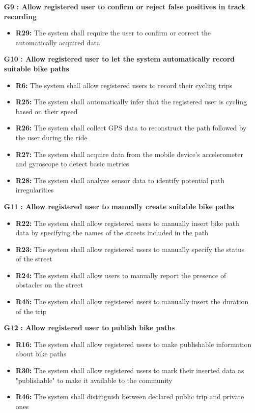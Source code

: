 \textbf{G9 : Allow registered user to confirm or reject false positives in track recording}
\begin{itemize}
    \item \textbf{R29:} The system shall require the user to confirm or correct the automatically acquired data
\end{itemize}
\vspace{1cm}

\textbf{G10 : Allow registered user to let the system automatically record suitable bike paths}
\begin{itemize}
    \item \textbf{R6:} The system shall allow registered users to record their cycling trips
    \item \textbf{R25:} The system shall automatically infer that the registered user is cycling based on their speed
    \item \textbf{R26:} The system shall collect GPS data to reconstruct the path followed by the user during the ride
    \item \textbf{R27:} The system shall acquire data from the mobile device's accelerometer and gyroscope to detect basic metrics
    \item \textbf{R28:} The system shall analyze sensor data to identify potential path irregularities
\end{itemize}
\vspace{1cm}

\textbf{G11 : Allow registered user to manually create suitable bike paths}
\begin{itemize}
    \item \textbf{R22:} The system shall allow registered users to manually insert bike path data by specifying the names of the streets included in the path
    \item \textbf{R23:} The system shall allow registered users to manually specify the status of the street
    \item \textbf{R24:} The system shall allow users to manually report the presence of obstacles on the street
    \item \textbf{R45:} The system shall allow registered users to manually insert the duration of the trip
\end{itemize}
\vspace{1cm}

\textbf{G12 : Allow registered user to publish bike paths}
\begin{itemize}
    \item \textbf{R16:} The system shall allow registered users to make publishable information about bike paths
    \item \textbf{R30:} The system shall allow registered users to mark their inserted data as "publishable" to make it available to the community
    \item \textbf{R46:} The system shall distinguish between declared public trip and private ones
\end{itemize}
\vspace{1cm}

